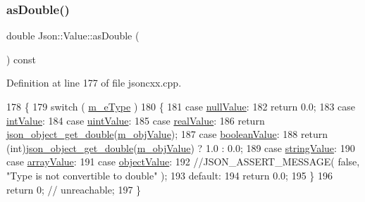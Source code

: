 \subsubsection{\texorpdfstring{as\+Double()}{asDouble()}}
{\footnotesize\ttfamily double Json\+::\+Value\+::as\+Double (\begin{DoxyParamCaption}{ }\end{DoxyParamCaption}) const}



Definition at line 177 of file jsoncxx.\+cpp.


\begin{DoxyCode}
178     \{
179         \textcolor{keywordflow}{switch} ( \hyperlink{class_json_1_1_value_ae6116e08a5c1833f858c1d29156365b1}{m\_eType} )
180         \{
181         \textcolor{keywordflow}{case} \hyperlink{namespace_json_a7d654b75c16a57007925868e38212b4ea7d9899633b4409bd3fc107e6737f8391}{nullValue}:
182             \textcolor{keywordflow}{return} 0.0;
183         \textcolor{keywordflow}{case} \hyperlink{namespace_json_a7d654b75c16a57007925868e38212b4eae5a9d708d5c9e23ae9bf98898522512d}{intValue}:
184         \textcolor{keywordflow}{case} \hyperlink{namespace_json_a7d654b75c16a57007925868e38212b4eaea788d9a3bb00adc6d68d97d43e1ccd3}{uintValue}:
185         \textcolor{keywordflow}{case} \hyperlink{namespace_json_a7d654b75c16a57007925868e38212b4eab837c7b869c14d8be712deb45c9e490e}{realValue}:
186             \textcolor{keywordflow}{return} \hyperlink{json__object_8c_ad7a7a813a948a1be644d2334281bf09a}{json\_object\_get\_double}(\hyperlink{class_json_1_1_value_a3a705e06c2dbc4a6e142b58b0cbca57e}{m\_objValue});
187         \textcolor{keywordflow}{case} \hyperlink{namespace_json_a7d654b75c16a57007925868e38212b4ea14c30dbf4da86f7b809be299f671f7fd}{booleanValue}:
188             \textcolor{keywordflow}{return} (\textcolor{keywordtype}{int})\hyperlink{json__object_8c_ad7a7a813a948a1be644d2334281bf09a}{json\_object\_get\_double}(\hyperlink{class_json_1_1_value_a3a705e06c2dbc4a6e142b58b0cbca57e}{m\_objValue}) ? 1.0 : 0.0;
189         \textcolor{keywordflow}{case} \hyperlink{namespace_json_a7d654b75c16a57007925868e38212b4ea804ef857affea2d415843c73f261c258}{stringValue}:
190         \textcolor{keywordflow}{case} \hyperlink{namespace_json_a7d654b75c16a57007925868e38212b4eadc8f264f36b55b063c78126b335415f4}{arrayValue}:
191         \textcolor{keywordflow}{case} \hyperlink{namespace_json_a7d654b75c16a57007925868e38212b4eae8386dcfc36d1ae897745f7b4f77a1f6}{objectValue}:
192             \textcolor{comment}{//JSON\_ASSERT\_MESSAGE( false, "Type is not convertible to double" );}
193         \textcolor{keywordflow}{default}:
194             \textcolor{keywordflow}{return} 0.0;
195         \}
196         \textcolor{keywordflow}{return} 0; \textcolor{comment}{// unreachable;}
197     \}
\end{DoxyCode}
\mbox{\label{class_json_1_1_value_a2dd28c1e9957927b2c4601eeb2fb56e1}} 
